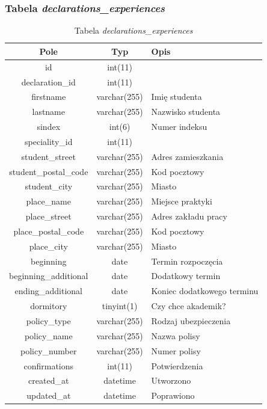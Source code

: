\documentclass[a4paper,12pt,oneside]{report}
\begin{document}
\newpage
\subsubsection{Tabela \emph{declarations\_experiences}}
\label{subsub:declarations_experiences}

\begin{table}[h]
  \centering
  \begin{tabular}{|c|c|l|}\hline
  Pole & Typ & Opis \\\hline
  id   & int(11)   & \\
  declaration\_id       & int(11)      & \\
  firstname             & varchar(255) & Imię studenta \\
  lastname              & varchar(255) & Nazwisko studenta \\
  sindex                & int(6)       & Numer indeksu \\
  speciality\_id        & int(11)      & \\
  student\_street       & varchar(255) & Adres zamieszkania \\
  student\_postal\_code & varchar(255) & Kod pocztowy\\
  student\_city         & varchar(255) & Miasto \\
  place\_name           & varchar(255) & Miejsce praktyki \\
  place\_street         & varchar(255) & Adres zakładu pracy \\
  place\_postal\_code   & varchar(255) & Kod pocztowy\\
  place\_city           & varchar(255) & Miasto \\
  beginning             & date         & Termin rozpoczęcia \\
  beginning\_additional & date         & Dodatkowy termin \\
  ending\_additional    & date         & Koniec dodatkowego terminu \\
  dormitory             & tinyint(1)   & Czy chce akademik? \\
  policy\_type          & varchar(255) & Rodzaj ubezpieczenia \\
  policy\_name          & varchar(255) & Nazwa polisy \\
  policy\_number        & varchar(255) & Numer polisy \\
  confirmations         & int(11)      & Potwierdzenia \\
  created\_at           & datetime     & Utworzono \\
  updated\_at           & datetime     & Poprawiono \\\hline
  \end{tabular}
  \caption{Tabela \emph{declarations\_experiences}\label{tab:declarations_experiences}}
\end{table}
\end{document}
